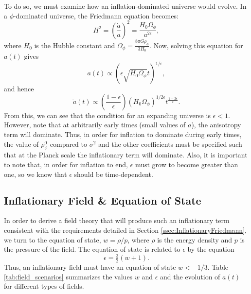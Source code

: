\documentclass[onecolumn,apj]{emulateapj}
\newcommand{\mep}[1]{{\color{applegreen} \textbf{[MEP:  #1]}}}
\begin{document}
To do so, we must examine how an inflation-dominated universe would evolve. In a $\phi$-dominated universe, the Friedmann equation becomes:
\begin{equation}
H^2 = \left ( \frac{\dot a}{a} \right ) ^2 = \frac{H_0 \Omega_\phi}{a^{2\epsilon}},
\label{eqn:Friedmann_phi}
\end{equation}
where $H_0$ is the Hubble constant and $\Omega_\phi = \tfrac{8\pi G \rho_\phi}{3 H_0}$. Now, solving this equation for $a(t)$ gives
\begin{equation}
a(t) \propto (\epsilon \sqrt{H_0 \Omega_\phi} t)^{1/\epsilon},
\label{eqn:inflation_a(t)}
\end{equation}
and hence 
\begin{equation}
\ddot a(t) \propto \left ( \frac{1-\epsilon}{\epsilon} \right ) (H_0 \Omega_\phi)^{1/2\epsilon} t^{\tfrac{1-2\epsilon}{\epsilon}}. 
\end{equation}
From this, we can see that the condition for an expanding universe is $\epsilon<1$. 
However, note that at arbitrarily early times (small values of $a$), the anisotropy term will dominate. Thus, in order for inflation to dominate during early times, the value of $\rho^0_\phi$ compared to $\sigma^2$ and the other coefficients must be specified such that at the Planck scale the inflationary term will dominate. %
Also, it is important to note that, in order for inflation to end, $\epsilon$ must grow to become greater than one, so we know that $\epsilon$ should be time-dependent. 

\subsection{Inflationary Field \& Equation of State}

In order to derive a field theory that will produce such an inflationary term consistent with the requirements detailed in Section \ref{ssec:InflationaryFriedmann}, we turn to the equation of state, $w=\rho/p$, where $\rho$ is the energy density and $p$ is the pressure of the field. The equation of state is related to $\epsilon$ by the equation 
\begin{equation}
\epsilon = \tfrac{3}{2}(w+1). 
\label{eqn:eps_w}
\end{equation}
Thus, an inflationary field must have an equation of state $w<-1/3$. Table \ref{tab:field_scenarios} summarizes the values $w$ and $\epsilon$ and the evolution of $a(t)$ for different types of fields. 
\end{document}
